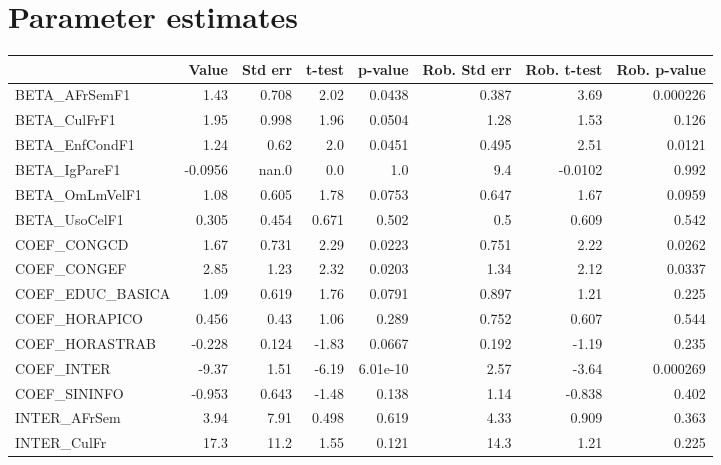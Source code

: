 \section{Parameter estimates}
\begin{tabular}{lrrrrrrr}
\toprule
{} &   Value &  Std err &  t-test &  p-value &  Rob. Std err &  Rob. t-test &  Rob. p-value \\
\midrule
BETA\_AFrSemF1      &    1.43 &    0.708 &    2.02 &   0.0438 &         0.387 &         3.69 &      0.000226 \\
BETA\_CulFrF1       &    1.95 &    0.998 &    1.96 &   0.0504 &          1.28 &         1.53 &         0.126 \\
BETA\_EnfCondF1     &    1.24 &     0.62 &     2.0 &   0.0451 &         0.495 &         2.51 &        0.0121 \\
BETA\_IgPareF1      & -0.0956 &    nan.0 &     0.0 &      1.0 &           9.4 &      -0.0102 &         0.992 \\
BETA\_OmLmVelF1     &    1.08 &    0.605 &    1.78 &   0.0753 &         0.647 &         1.67 &        0.0959 \\
BETA\_UsoCelF1      &   0.305 &    0.454 &   0.671 &    0.502 &           0.5 &        0.609 &         0.542 \\
COEF\_CONGCD        &    1.67 &    0.731 &    2.29 &   0.0223 &         0.751 &         2.22 &        0.0262 \\
COEF\_CONGEF        &    2.85 &     1.23 &    2.32 &   0.0203 &          1.34 &         2.12 &        0.0337 \\
COEF\_EDUC\_BASICA   &    1.09 &    0.619 &    1.76 &   0.0791 &         0.897 &         1.21 &         0.225 \\
COEF\_HORAPICO      &   0.456 &     0.43 &    1.06 &    0.289 &         0.752 &        0.607 &         0.544 \\
COEF\_HORASTRAB     &  -0.228 &    0.124 &   -1.83 &   0.0667 &         0.192 &        -1.19 &         0.235 \\
COEF\_INTER         &   -9.37 &     1.51 &   -6.19 & 6.01e-10 &          2.57 &        -3.64 &      0.000269 \\
COEF\_SININFO       &  -0.953 &    0.643 &   -1.48 &    0.138 &          1.14 &       -0.838 &         0.402 \\
INTER\_AFrSem       &    3.94 &     7.91 &   0.498 &    0.619 &          4.33 &        0.909 &         0.363 \\
INTER\_CulFr        &    17.3 &     11.2 &    1.55 &    0.121 &          14.3 &         1.21 &         0.225 \\

\end{tabular}
